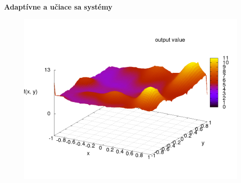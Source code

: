 \documentclass[xcolor=dvipsnames]{beamer}
\begin{document}
\begin{frame}{\bf Adaptívne a učiace sa systémy}
\begin{minipage}{.5\textwidth}
  \begin{figure}[!htb]
  \centering
  \includegraphics[scale=.2]{../pictures/function_f0.png}
  \end{figure}

\end{minipage}
\end{frame}
\end{document}
